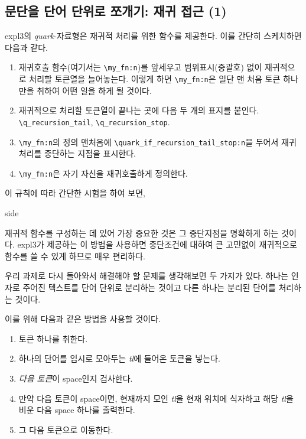 \documentclass[a4paper]{oblivoir}
\begin{document}
\subsection{문단을 단어 단위로 쪼개기: 재귀 접근 (1)}

expl3의 \emph{quark}-자료형은 재귀적 처리를 위한 함수를 제공한다. 이를 간단히 스케치하면 다음과 같다.

\begin{enumerate}[(1)] \firmlist
    \item 재귀호출 함수(여기서는 \verb|\my_fn:n|)를 앞세우고 범위표시(중괄호) 없이 재귀적으로 처리할 토큰열을 늘어놓는다. 이렇게 하면 \verb|\my_fn:n|은 일단 맨 처음 토큰 하나만을 취하여 어떤 일을 하게 될 것이다. 
    \item 재귀적으로 처리할 토큰열이 끝나는 곳에 다음 두 개의 표지를 붙인다. \verb|\q_recursion_tail|, \verb|\q_recursion_stop|.
    \item \verb|\my_fn:n|의 정의 맨처음에 \verb|\quark_if_recursion_tail_stop:n|을 두어서 재귀처리를 중단하는 지점을 표시한다.
    \item \verb|\my_fn:n|은 자기 자신을 재귀호출하게 정의한다.
\end{enumerate}
이 규칙에 따라 간단한 시험을 하여 보면,


\begin{mylistingtext}{side}
\end{mylistingtext}

재귀적 함수를 구성하는 데 있어 가장 중요한 것은 그 중단지점을 명확하게 하는 것이다.
expl3가 제공하는 이 방법을 사용하면 중단조건에 대하여 큰 고민없이 재귀적으로 함수를 쓸 수 있게 하므로 매우 편리하다.

\bigskip

우리 과제로 다시 돌아와서 해결해야 할 문제를 생각해보면 두 가지가 있다. 하나는 인자로 주어진 텍스트를 단어 단위로 분리하는 것이고 
다른 하나는 분리된 단어를 처리하는 것이다.

이를 위해 다음과 같은 방법을 사용할 것이다.
\begin{enumerate}[(1)] \firmlist
    \item 토큰 하나를 취한다.
    \item 하나의 단어를 임시로 모아두는 \emph{tl}에 들어온 토큰을 넣는다.
    \item \emph{다음 토큰}이 space인지 검사한다.
    \item 만약 다음 토큰이 space이면, 현재까지 모인 \emph{tl}을 현재 위치에 식자하고 해당 \emph{tl}을 비운 다음 space 하나를 출력한다.
    \item 그 다음 토큰으로 이동한다.
\end{enumerate}
\end{document}
